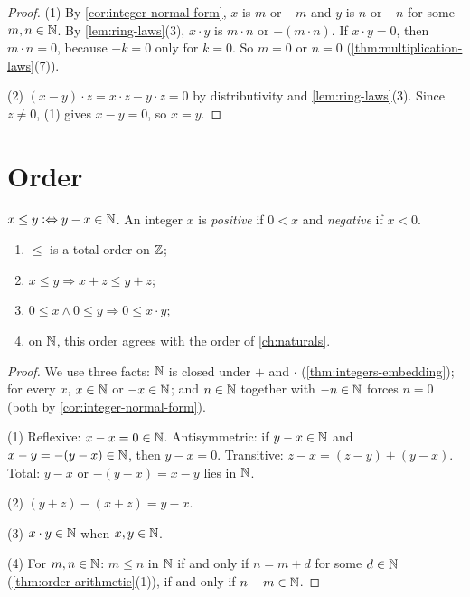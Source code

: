\begin{proof}
(1) By \cref{cor:integer-normal-form}, $x$ is $m$ or $-m$ and $y$ is $n$ or $-n$
for some $m, n \in \mathbb{N}$. By \cref{lem:ring-laws}(3), $x \cdot y$ is $m \cdot n$ or
$-(m \cdot n)$. If $x \cdot y = 0$, then $m \cdot n = 0$, because $-k = 0$ only for
$k = 0$. So $m = 0$ or $n = 0$ (\cref{thm:multiplication-laws}(7)).

(2) $(x - y) \cdot z = x \cdot z - y \cdot z = 0$ by distributivity and
\cref{lem:ring-laws}(3). Since $z \neq 0$, (1) gives $x - y = 0$, so $x = y$.
\end{proof}

\section{Order}

\begin{definition}[Order on $\Z$]
\label{def:integer-order}
$x \le y \mathrel{\vcentcolon\Leftrightarrow} y - x \in \mathbb{N}$. An integer $x$ is \emph{positive} if $0 < x$ and
\emph{negative} if $x < 0$.
\end{definition}

\begin{theorem}
\label{thm:integers-ordered}
\leavevmode
\begin{enumerate}
  \item $\le$ is a total order on $\Z$;
  \item $x \le y \Rightarrow x + z \le y + z$;
  \item $0 \le x \land 0 \le y \Rightarrow 0 \le x \cdot y$;
  \item on $\mathbb{N}$, this order agrees with the order of \cref{ch:naturals}.
\end{enumerate}
\end{theorem}

\begin{proof}
We use three facts: $\mathbb{N}$ is closed under $+$ and $\cdot$
(\cref{thm:integers-embedding}); for every $x$, $x \in \mathbb{N}$ or $-x \in \mathbb{N}$; and
$n \in \mathbb{N}$ together with $-n \in \mathbb{N}$ forces $n = 0$ (both by
\cref{cor:integer-normal-form}).

(1) Reflexive: $x - x = 0 \in \mathbb{N}$. Antisymmetric: if $y - x \in \mathbb{N}$ and $x - y =
-(y - x) \in \mathbb{N}$, then $y - x = 0$. Transitive: $z - x = (z - y) + (y - x)$. Total:
$y - x$ or $-(y - x) = x - y$ lies in $\mathbb{N}$.

(2) $(y + z) - (x + z) = y - x$.

(3) $x \cdot y \in \mathbb{N}$ when $x, y \in \mathbb{N}$.

(4) For $m, n \in \mathbb{N}$: $m \le n$ in $\mathbb{N}$ if and only if $n = m + d$ for some $d
\in \mathbb{N}$ (\cref{thm:order-arithmetic}(1)), if and only if $n - m \in \mathbb{N}$.
\end{proof}

